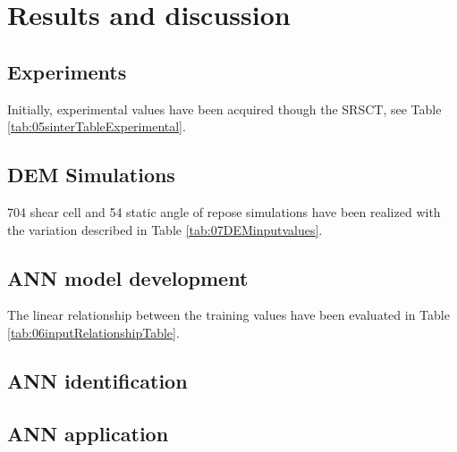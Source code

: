 
\section{Results and discussion}
\label{sec:results}

\subsection{Experiments}
\label{subsec:experiments}

Initially, experimental values have been acquired though the SRSCT, see Table
\ref{tab:05sinterTableExperimental}.



% 
% 

\subsection{DEM Simulations}
\label{subsec:simulations}
% 
704 shear cell and 54 static angle of repose simulations have been realized with
the variation described in Table \ref{tab:07DEMinputvalues}.



\subsection{ANN model development}
\label{subsec:annmodeldev}

The linear relationship between the training values have been evaluated in
Table \ref{tab:06inputRelationshipTable}.

% 

\subsection{ANN identification}
\label{subsec:annmodeliden}
% 

\subsection{ANN application}
\label{subsec:annapplication}



% 
% 
% 
% 
% 

